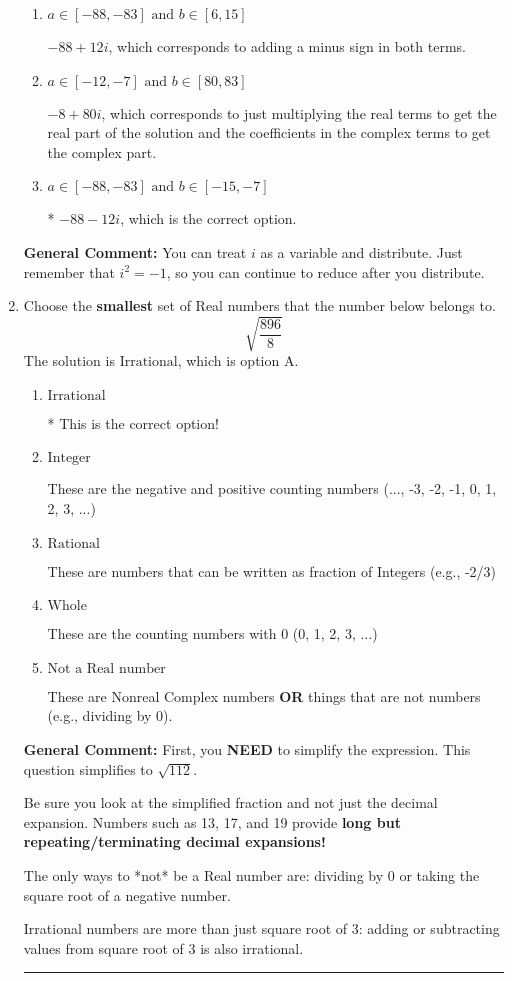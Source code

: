 \documentclass{extbook}[14pt]
\newcommand{\litem}[1]{\item #1

\rule{\textwidth}{0.4pt}}
\begin{document}
\begin{enumerate}
{\begin{enumerate}[label=\Alph*.]
 $72 + 52 i$, which corresponds to adding a minus sign in the second term.
\item \( a \in [-88, -83] \text{ and } b \in [6, 15] \)

 $-88 + 12 i$, which corresponds to adding a minus sign in both terms.
\item \( a \in [-12, -7] \text{ and } b \in [80, 83] \)

 $-8 + 80 i$, which corresponds to just multiplying the real terms to get the real part of the solution and the coefficients in the complex terms to get the complex part.
\item \( a \in [-88, -83] \text{ and } b \in [-15, -7] \)

* $-88 - 12 i$, which is the correct option.
\end{enumerate}

\textbf{General Comment:} You can treat $i$ as a variable and distribute. Just remember that $i^2=-1$, so you can continue to reduce after you distribute.
}
\litem{
Choose the \textbf{smallest} set of Real numbers that the number below belongs to.
\[ \sqrt{\frac{896}{8}} \]
The solution is \( \text{Irrational} \), which is option A.\begin{enumerate}[label=\Alph*.]
\item \( \text{Irrational} \)

* This is the correct option!
\item \( \text{Integer} \)

These are the negative and positive counting numbers (..., -3, -2, -1, 0, 1, 2, 3, ...)
\item \( \text{Rational} \)

These are numbers that can be written as fraction of Integers (e.g., -2/3)
\item \( \text{Whole} \)

These are the counting numbers with 0 (0, 1, 2, 3, ...)
\item \( \text{Not a Real number} \)

These are Nonreal Complex numbers \textbf{OR} things that are not numbers (e.g., dividing by 0).
\end{enumerate}

\textbf{General Comment:} First, you \textbf{NEED} to simplify the expression. This question simplifies to $\sqrt{112}$. 
 
 Be sure you look at the simplified fraction and not just the decimal expansion. Numbers such as 13, 17, and 19 provide \textbf{long but repeating/terminating decimal expansions!} 
 
 The only ways to *not* be a Real number are: dividing by 0 or taking the square root of a negative number. 
 
 Irrational numbers are more than just square root of 3: adding or subtracting values from square root of 3 is also irrational.
}
\end{enumerate}
\end{document}
